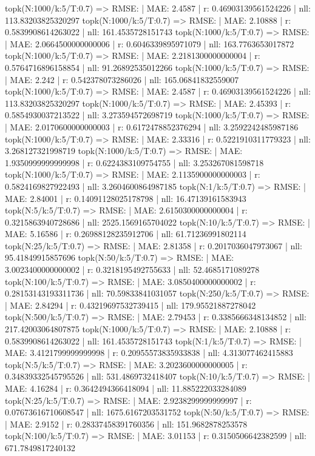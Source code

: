 topk(N:1000/k:5/T:0.7) => RMSE: | MAE: 2.4587 | r: 0.46903139561524226 | nll: 113.83203825320297
topk(N:1000/k:5/T:0.7) => RMSE: | MAE: 2.10888 | r: 0.5839908614263022 | nll: 161.4535728151743
topk(N:1000/k:5/T:0.7) => RMSE: | MAE: 2.0664500000000006 | r: 0.6046339895971079 | nll: 163.7763653017872
topk(N:1000/k:5/T:0.7) => RMSE: | MAE: 2.2181300000000004 | r: 0.5764716896158854 | nll: 91.26892535012266
topk(N:1000/k:5/T:0.7) => RMSE: | MAE: 2.242 | r: 0.542378073286026 | nll: 165.06841832559007
topk(N:1000/k:5/T:0.7) => RMSE: | MAE: 2.4587 | r: 0.46903139561524226 | nll: 113.83203825320297
topk(N:1000/k:5/T:0.7) => RMSE: | MAE: 2.45393 | r: 0.5854930037213522 | nll: 3.273594572698719
topk(N:1000/k:5/T:0.7) => RMSE: | MAE: 2.0170600000000003 | r: 0.6172478852376294 | nll: 3.2592242485987186
topk(N:1000/k:5/T:0.7) => RMSE: | MAE: 2.33316 | r: 0.5221910311779323 | nll: 3.268127321998719
topk(N:1000/k:5/T:0.7) => RMSE: | MAE: 1.9350999999999998 | r: 0.6224383109754755 | nll: 3.253267081598718
topk(N:1000/k:5/T:0.7) => RMSE: | MAE: 2.1135900000000003 | r: 0.5824169827922493 | nll: 3.2604600864987185
topk(N:1/k:5/T:0.7) => RMSE: | MAE: 2.84001 | r: 0.14091128025178798 | nll: 16.47139161583943
topk(N:5/k:5/T:0.7) => RMSE: | MAE: 2.6150300000000004 | r: 0.3215863940728686 | nll: 2525.1569165704022
topk(N:10/k:5/T:0.7) => RMSE: | MAE: 5.16586 | r: 0.26988128235912706 | nll: 61.71236991802114
topk(N:25/k:5/T:0.7) => RMSE: | MAE: 2.81358 | r: 0.2017036047973067 | nll: 95.41849915857696
topk(N:50/k:5/T:0.7) => RMSE: | MAE: 3.0023400000000002 | r: 0.3218195492755633 | nll: 52.4685171089278
topk(N:100/k:5/T:0.7) => RMSE: | MAE: 3.0850400000000002 | r: 0.28153143193311736 | nll: 70.59833841031057
topk(N:250/k:5/T:0.7) => RMSE: | MAE: 2.84294 | r: 0.43219697532739415 | nll: 179.95521887278042
topk(N:500/k:5/T:0.7) => RMSE: | MAE: 2.79453 | r: 0.3385666348134852 | nll: 217.42003064807875
topk(N:1000/k:5/T:0.7) => RMSE: | MAE: 2.10888 | r: 0.5839908614263022 | nll: 161.4535728151743
topk(N:1/k:5/T:0.7) => RMSE: | MAE: 3.4121799999999998 | r: 0.20955573835933838 | nll: 4.313077462415883
topk(N:5/k:5/T:0.7) => RMSE: | MAE: 3.2023600000000005 | r: 0.34839332545795526 | nll: 531.4869732418407
topk(N:10/k:5/T:0.7) => RMSE: | MAE: 4.16284 | r: 0.3642494366418094 | nll: 11.885222033284089
topk(N:25/k:5/T:0.7) => RMSE: | MAE: 2.9238299999999997 | r: 0.07673616710608547 | nll: 1675.6167203531752
topk(N:50/k:5/T:0.7) => RMSE: | MAE: 2.9152 | r: 0.28337458391760356 | nll: 151.9682878253578
topk(N:100/k:5/T:0.7) => RMSE: | MAE: 3.01153 | r: 0.3150506642382599 | nll: 671.7849817240132

